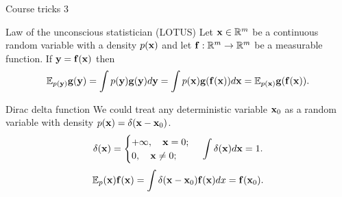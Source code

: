 \begin{frame}{Course tricks 3}
	\begin{block}{Law of the unconscious statistician (LOTUS)}
		Let $\mathbf{x} \in \mathbb{R}^m$ be a continuous random variable with a density $p(\mathbf{x})$ and let $\mathbf{f}: \mathbb{R}^m \rightarrow \mathbb{R}^m$ be a measurable function. If $\mathbf{y}=\mathbf{f}(\mathbf{x})$ then
		\[
			\mathbb{E}_{p(\mathbf{y})} \mathbf{g}(\mathbf{y}) = \int p(\mathbf{y}) \mathbf{g}(\mathbf{y}) d \mathbf{y} = \int p(\mathbf{x}) \mathbf{g}(\mathbf{f}(\mathbf{x})) d \mathbf{x} = \mathbb{E}_{p(\mathbf{x})} \mathbf{g}(\mathbf{f}(\mathbf{x})).
		\]
		\vspace{-0.4cm}
	\end{block}
	\begin{block}{Dirac delta function}
		We could treat any deterministic variable $\mathbf{x}_0$ as a random variable with density $p(\mathbf{x}) = \delta(\mathbf{x} - \mathbf{x}_0)$. 
		\vspace{-0.3cm}
		\[
			\delta(\mathbf{x}) = 
			\begin{cases}
				+\infty, \quad \mathbf{x} = 0; \\
				0, \quad \mathbf{x} \neq 0;
			\end{cases} \, 
			\int \delta(\mathbf{x}) d\mathbf{x} = 1.
		\]
		\[
			\mathbb{E}_p(\mathbf{x}) \mathbf{f}(\mathbf{x}) = \int \delta (\mathbf{x} - \mathbf{x}_0) \mathbf{f}(\mathbf{x}) dx = \mathbf{f}(\mathbf{x}_0).
		\]
	\end{block}
\end{frame}

